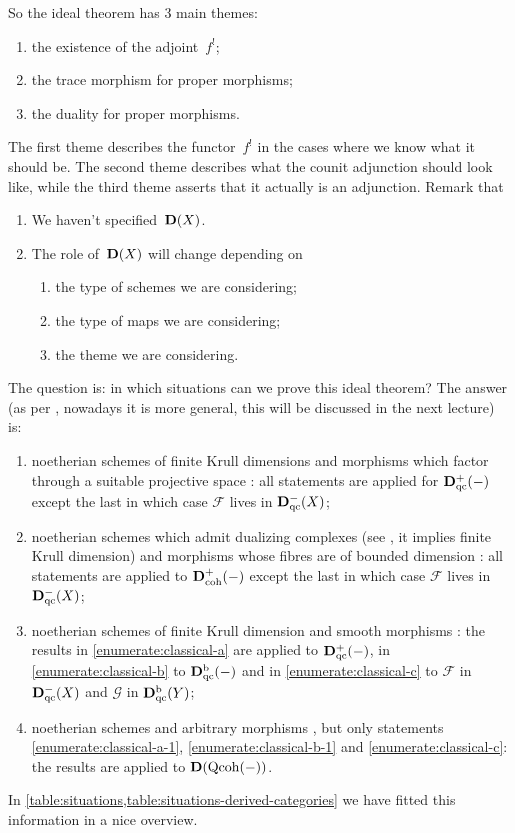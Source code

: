 So the ideal theorem has 3 main themes:
\begin{enumerate}
  \item the existence of the adjoint~$f^!$;
  \item the trace morphism for proper morphisms;
  \item the duality for proper morphisms.
\end{enumerate}
The first theme describes the functor~$f^!$ in the cases where we know what it should be. The second theme describes what the counit adjunction should look like, while the third theme asserts that it actually is an adjunction. Remark that
\begin{enumerate}
  \item We haven't specified~$\mathbf{D}(X)$.
  \item The role of~$\mathbf{D}(X)$ will change depending on
    \begin{enumerate}
      \item the type of schemes we are considering;
      \item the type of maps we are considering;
      \item the theme we are considering.
    \end{enumerate}
\end{enumerate}

The question is: in which situations can we prove this ideal theorem? The answer (as per \cite{hartshorne-residues-and-duality}, nowadays it is more general, this will be discussed in the next lecture) is:
\begin{enumerate}
  \item noetherian schemes of finite Krull dimensions and morphisms which factor through a suitable projective space \cite[\S III.8, \S III.10, \S III.11]{hartshorne-residues-and-duality}: all statements are applied for $\mathbf{D}_{\mathrm{qc}}^+(-)$ except the last in which case $\mathcal{F}$ lives in $\mathbf{D}_{\mathrm{qc}}^-(X)$;
  \item noetherian schemes which admit dualizing complexes (see \cite[\S V.10]{hartshorne-residues-and-duality}, it implies finite Krull dimension) and morphisms whose fibres are of bounded dimension \cite[\S VII.3]{hartshorne-residues-and-duality}: all statements are applied to $\mathbf{D}_{\mathrm{coh}}^+(-)$ except the last in which case $\mathcal{F}$ lives in $\mathbf{D}_{\mathrm{qc}}^-(X)$;
  \item noetherian schemes of finite Krull dimension and smooth morphisms \cite[\S VII.4]{hartshorne-residues-and-duality}: the results in \ref{enumerate:classical-a} are applied to $\mathbf{D}_{\mathrm{qc}}^+(-)$, in \ref{enumerate:classical-b} to $\mathbf{D}_{\mathrm{qc}}^{\mathrm{b}}(-)$ and in \ref{enumerate:classical-c} to $\mathcal{F}$ in $\mathbf{D}_{\mathrm{qc}}^-(X)$ and $\mathcal{G}$ in $\mathbf{D}_{\mathrm{qc}}^{\mathrm{b}}(Y)$;
  \item noetherian schemes and arbitrary morphisms \cite[appendix]{hartshorne-residues-and-duality}, but only statements \ref{enumerate:classical-a-1}, \ref{enumerate:classical-b-1} and \ref{enumerate:classical-c}: the results are applied to $\mathbf{D}(\mathrm{Qcoh}(-))$.
\end{enumerate}
In \cref{table:situations,table:situations-derived-categories} we have fitted this information in a nice overview.

